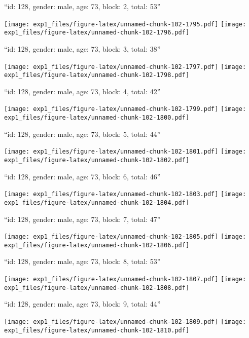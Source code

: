 \documentclass[11pt,,]{article}
\begin{document}
\newpage
[1] 

``id: 128, gender: male, age: 73, block: 2, total: 53''

\texttt{[image: exp1\_files/figure-latex/unnamed-chunk-102-1795.pdf]}
\texttt{[image: exp1\_files/figure-latex/unnamed-chunk-102-1796.pdf]}

\newpage
[1] 

``id: 128, gender: male, age: 73, block: 3, total: 38''

\texttt{[image: exp1\_files/figure-latex/unnamed-chunk-102-1797.pdf]}
\texttt{[image: exp1\_files/figure-latex/unnamed-chunk-102-1798.pdf]}

\newpage
[1] 

``id: 128, gender: male, age: 73, block: 4, total: 42''

\texttt{[image: exp1\_files/figure-latex/unnamed-chunk-102-1799.pdf]}
\texttt{[image: exp1\_files/figure-latex/unnamed-chunk-102-1800.pdf]}

\newpage
[1] 

``id: 128, gender: male, age: 73, block: 5, total: 44''

\texttt{[image: exp1\_files/figure-latex/unnamed-chunk-102-1801.pdf]}
\texttt{[image: exp1\_files/figure-latex/unnamed-chunk-102-1802.pdf]}

\newpage
[1] 

``id: 128, gender: male, age: 73, block: 6, total: 46''

\texttt{[image: exp1\_files/figure-latex/unnamed-chunk-102-1803.pdf]}
\texttt{[image: exp1\_files/figure-latex/unnamed-chunk-102-1804.pdf]}

\newpage
[1] 

``id: 128, gender: male, age: 73, block: 7, total: 47''

\texttt{[image: exp1\_files/figure-latex/unnamed-chunk-102-1805.pdf]}
\texttt{[image: exp1\_files/figure-latex/unnamed-chunk-102-1806.pdf]}

\newpage
[1] 

``id: 128, gender: male, age: 73, block: 8, total: 53''

\texttt{[image: exp1\_files/figure-latex/unnamed-chunk-102-1807.pdf]}
\texttt{[image: exp1\_files/figure-latex/unnamed-chunk-102-1808.pdf]}

\newpage
[1] 

``id: 128, gender: male, age: 73, block: 9, total: 44''

\texttt{[image: exp1\_files/figure-latex/unnamed-chunk-102-1809.pdf]}
\texttt{[image: exp1\_files/figure-latex/unnamed-chunk-102-1810.pdf]}
\end{document}
